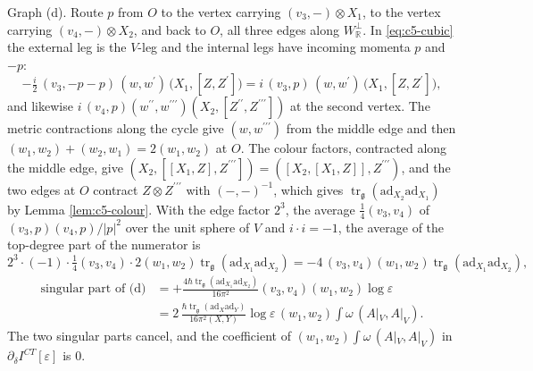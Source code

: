 \begin{example}
Graph (d). Route $p$ from $O$ to the vertex carrying $(v_3,-)\otimes X_1$, to the vertex carrying $(v_4,-)\otimes X_2$, and back to $O$, all three edges along $W_{\mathbb R}^\perp$. In \eqref{eq:c5-cubic} the external leg is the $V$-leg and the internal legs have incoming momenta $p$ and $-p$:
\[
-\tfrac i2\,(v_3,-p-p)\,(w,w^{\prime})\,\big(X_1,[Z,Z^{\prime}]\big)=i\,(v_3,p)\,(w,w^{\prime})\,\big(X_1,[Z,Z^{\prime}]\big),
\]
and likewise $i\,(v_4,p)(w^{\prime\prime},w^{\prime\prime\prime})(X_2,[Z^{\prime\prime},Z^{\prime\prime\prime}])$ at the second vertex. The metric contractions along the cycle give $(w,w^{\prime\prime\prime})$ from the middle edge and then $(w_1,w_2)+(w_2,w_1)=2(w_1,w_2)$ at $O$. The colour factors, contracted along the middle edge, give $(X_2,[[X_1,Z],Z^{\prime\prime\prime}])=([X_2,[X_1,Z]],Z^{\prime\prime\prime})$, and the two edges at $O$ contract $Z\otimes Z^{\prime\prime\prime}$ with $(-,-)^{-1}$, which gives $\operatorname{tr}_{\mathfrak g}(\mathrm{ad}_{X_2}\mathrm{ad}_{X_1})$ by Lemma \ref{lem:c5-colour}. With the edge factor $2^3$, the average $\frac14(v_3,v_4)$ of $(v_3,p)(v_4,p)/|p|^2$ over the unit sphere of $V$ and $i\cdot i=-1$, the average of the top-degree part of the numerator is
\[
2^3\cdot(-1)\cdot\tfrac14(v_3,v_4)\cdot2(w_1,w_2)\operatorname{tr}_{\mathfrak g}(\mathrm{ad}_{X_1}\mathrm{ad}_{X_2})=-4\,(v_3,v_4)(w_1,w_2)\operatorname{tr}_{\mathfrak g}(\mathrm{ad}_{X_1}\mathrm{ad}_{X_2}),
\]
\[
\begin{aligned}
\text{singular part of (d)}&=+\frac{4\hbar\operatorname{tr}_{\mathfrak g}(\mathrm{ad}_{X_1}\mathrm{ad}_{X_2})}{16\pi^2}(v_3,v_4)(w_1,w_2)\log\varepsilon\\
&=2\,\frac{\hbar\operatorname{tr}_{\mathfrak g}(\mathrm{ad}_X\mathrm{ad}_Y)}{16\pi^2(X,Y)}\log\varepsilon\,(w_1,w_2)\int\omega\,(A|_V,A|_V).
\end{aligned}
\]
The two singular parts cancel, and the coefficient of $(w_1,w_2)\int\omega\,(A|_V,A|_V)$ in $\partial_\delta I^{CT}[\varepsilon]$ is $0$.
\end{example}

